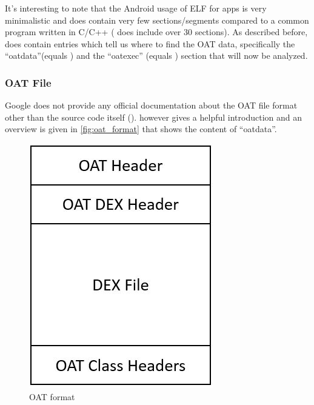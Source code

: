 It's interesting to note that the Android usage of ELF for apps
is very minimalistic and does contain very few sections/segments
compared to a common program written in C/C++ (
does include over 30 sections). As described before,
 does contain entries which tell us where to find
the OAT data, specifically the ``oatdata''(equals )
and the ``oatexec'' (equals )
section that will now be analyzed.

\subsubsection{OAT File}\label{section:oat_file}
Google does not provide any official documentation about the OAT
file format other than the source code itself
(). \parencite{hiding_behind_art}
however gives a helpful introduction and an overview is given
in \autoref{fig:oat_format} that shows the content of ``oatdata''.

\begin{figure}[htb]
  \centering
  \includegraphics[scale=0.5]{figures/oat_format}
  \caption[OAT format]{OAT format}
  \label{fig:oat_format}
\end{figure}

